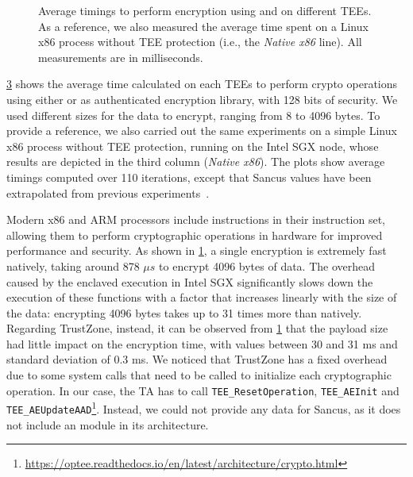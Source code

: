 \begin{figure}[t]
  \hspace*{-0.3cm}
  \begin{subfigure}{.48\linewidth}
    \centering
    \resizebox{.9\linewidth}{!} {
      
    }
    \caption{}
    \label{fig:eval-crypto-aes}
  \end{subfigure}
  \begin{subfigure}{.48\linewidth}
    \centering
    \resizebox{.9\linewidth}{!} {
      
    }
    \caption{}
    \label{fig:eval-crypto-spongent}
  \end{subfigure}
  \caption{Average timings to perform encryption using  and
   on different \acp{TEE}. As a reference, we also measured the
  average time spent on a Linux x86 process without \ac{TEE} protection (i.e.,
  the \emph{Native x86} line). All measurements are in milliseconds.}
  \label{fig:eval-crypto}
\end{figure}

\cref{fig:eval-crypto} shows the average time calculated on each \acp{TEE} to
perform crypto operations using either \aesgcm{} or \spongent{} as authenticated
encryption library, with 128 bits of security. We used different sizes for the
data to encrypt, ranging from 8 to 4096 bytes. To provide a reference, we also
carried out the same experiments on a simple Linux x86 process without \ac{TEE}
protection, running on the Intel \ac{SGX} node, whose results are depicted in
the third column (\emph{Native x86}). The plots show average timings computed
over 110 iterations, except that Sancus values have been extrapolated from
previous experiments~\cite{noorman_sancus2}.

Modern x86 and ARM processors include \aes{} instructions in their instruction
set, allowing them to perform cryptographic operations in hardware for improved
performance and security. As shown in \cref{fig:eval-crypto-aes}, a single
\aes{} encryption is extremely fast natively, taking around 878 $\mu s$ to
encrypt 4096 bytes of data. The overhead caused by the enclaved execution in
Intel \ac{SGX} significantly slows down the execution of these functions with a
factor that increases linearly with the size of the data: encrypting 4096 bytes
takes up to 31 times more than natively. Regarding TrustZone, instead, it can be
observed from \cref{fig:eval-crypto-aes} that the payload size had little impact
on the encryption time, with values between 30 and 31 ms and standard deviation
of 0.3 ms. We noticed that TrustZone has a fixed overhead due to some system
calls that need to be called to initialize each cryptographic operation. In our
case, the TA has to call \texttt{TEE\_ResetOperation}, \texttt{TEE\_AEInit} and
\texttt{TEE\_AEUpdateAAD}\footnote{\url{https://optee.readthedocs.io/en/latest/architecture/crypto.html}}.
Instead, we could not provide any data for Sancus, as it does not include an
\aes{} module in its architecture.

